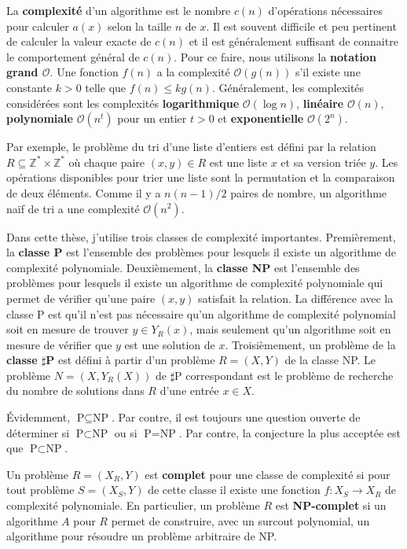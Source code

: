 La \textbf{complexité} d'un algorithme est le nombre $c(n)$ d'opérations nécessaires
pour calculer $a(x)$ selon la taille $n$ de $x$.
Il est souvent difficile et peu pertinent de calculer la valeur exacte de $c(n)$
et il est généralement suffisant de connaitre le comportement général de $c(n)$.
Pour ce faire,
nous utilisons la \textbf{notation grand $\mathcal O$}.
Une fonction $f(n)$ a la complexité $\mathcal O(g(n))$ s'il existe
une constante $k > 0$ telle que $f(n) \leq k g(n)$.
Généralement,
les complexités considérées sont les complexités \textbf{logarithmique} $\mathcal O(\log n)$,
\textbf{linéaire} $\mathcal O(n)$,
\textbf{polynomiale} $\mathcal O(n^t)$ pour un entier $t > 0$
et \textbf{exponentielle} $\mathcal O(2^n)$.

Par exemple,
le problème du tri d'une liste d'entiers est défini par la relation
$R \subseteq \mathbb Z^* \times \mathbb Z^*$
où chaque paire $(x, y) \in R$ est une liste $x$ et sa version triée $y$.
Les opérations disponibles pour trier une liste sont la permutation et
la comparaison de deux éléments.
Comme il y a $n(n-1)/2$ paires de nombre,
un algorithme naïf de tri a une complexité $\mathcal O(n^2)$.

Dans cette thèse,
j'utilise trois classes de complexité importantes.
Premièrement,
la \textbf{classe P} est l'ensemble des problèmes
pour lesquels il existe un algorithme de complexité polynomiale.
Deuxièmement,
la \textbf{classe NP} est l'ensemble des problèmes
pour lesquels il existe un algorithme de complexité polynomiale
qui permet de vérifier qu'une paire $(x, y)$ satisfait la relation.
La différence avec la classe P est qu'il n'est pas nécessaire qu'un 
algorithme de complexité polynomial soit en mesure de trouver $y \in Y_R(x)$,
mais seulement qu'un algorithme soit en mesure de vérifier que $y$ est une solution
de $x$.
Troisièmement,
un problème de la \textbf{classe $\sharp$P} est défini à partir d'un problème
$R = (X, Y)$ de la classe NP.
Le problème $N = (X, Y_R(X))$ de $\sharp$P correspondant est le problème de
recherche du nombre de solutions dans $R$ d'une entrée $x \in X$.

Évidemment, $\text{P} \subseteq \text{NP}$.
Par contre, 
il est toujours une question ouverte de déterminer si
$\text{P} \subset \text{NP}$ ou si $\text{P} = \text{NP}$.
Par contre,
la conjecture la plus acceptée est que $\text{P} \subset \text{NP}$.

Un problème $R = (X_R, Y)$ est \textbf{complet} pour une classe de complexité
si pour tout problème $S = (X_S, Y)$ de cette classe il existe une fonction 
$f: X_S \to X_R$ de complexité polynomiale.
En particulier,
un problème $R$ est \textbf{NP-complet} si un algorithme $A$ pour $R$
permet de construire, avec un surcout polynomial,
un algorithme pour résoudre un problème arbitraire de NP.

